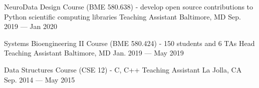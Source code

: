 

\begin{cventries}

 \cventry
    {NeuroData Design Course (BME 580.638) - develop open source contributions to Python scientific computing libraries} %
    {Teaching Assistant} %
    {Baltimore, MD} %
    {Sep. 2019 --- Jan 2020} %
    {\empty}
    \vspace{-\baselineskip}
   
 \cventry
    {Systems Bioengineering II Course (BME 580.424) - 150 students and 6 TAs} %
    {Head Teaching Assistant} %
    {Baltimore, MD} %
    {Jan. 2019 --- May 2019} %
    {\empty}
    \vspace{-\baselineskip}

 \cventry
    {Data Structures Course (CSE 12) - C, C++} %
    {Teaching Assistant} %
    {La Jolla, CA} %
    {Sep. 2014 --- May 2015} %
    {\empty}
    \vspace{-\baselineskip}

\end{cventries}
